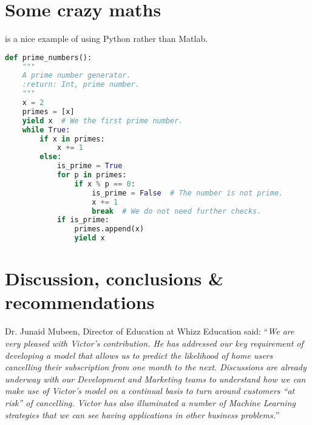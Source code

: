 \documentclass[english,a4,oneside,9pt]{extarticle}
\begin{document}
\lipsum[1]

\lipsum[1]


\section{Some crazy maths}

 is a nice example of using Python rather than Matlab.

\begin{lstfloat}[htb]
\begin{lstlisting}[language=Python, caption={[Example prime number generator]Some example python code, incase we wanted to show the company some awesome programming idea.}, label={code:example}, captionpos=b]
def prime_numbers():
	"""
	A prime number generator.
	:return: Int, prime number.
	"""
	x = 2
	primes = [x]
	yield x  # We the first prime number.
	while True:
		if x in primes:
			x += 1
		else:
			is_prime = True  
			for p in primes:
				if x % p == 0:
					is_prime = False  # The number is not prime.
					x += 1
					break  # We do not need further checks.
			if is_prime:
				primes.append(x)
				yield x
\end{lstlisting}
\end{lstfloat}

\blindmathpaper

\section{Discussion, conclusions \& recommendations}

Dr. Junaid Mubeen, Director of Education at Whizz Education said: ``\emph{We are very pleased with Victor's contribution. He has addressed our key requirement of developing a model that allows us to predict the likelihood of home users cancelling their subscription from one month to the next. Discussions are already underway with our Development and Marketing teams to understand how we can make use of Victor's model on a continual basis to turn around customers ``at risk'' of cancelling. Victor has also illuminated a number of Machine Learning strategies that we can see having applications in other business problems.}''


\cite{bradley2011parallelization}


\begin{small}

\end{small}
\end{document}
